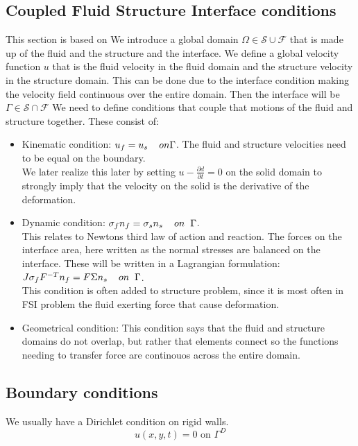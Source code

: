 \subsection*{Coupled Fluid Structure Interface conditions}
This section is based on 
We introduce a global domain $\Omega \in \mathcal{S} \cup \mathcal{F} $ that is made up of the fluid and the structure and the interface. We define a global velocity function $u$ that is the fluid velocity in the fluid domain and the structure velocity in the structure domain. This can be done due to the interface condition making the velocity field continuous over the entire domain. Then the interface will be $ \Gamma \in \mathcal{S} \cap \mathcal{F}  $  
We need to define conditions that couple that motions of the fluid and structure together. These consist of:
\begin{itemize}
\item Kinematic condition: $u_f = u_s  \hspace{4mm} on \Gamma$. The fluid and structure velocities need to be equal on the boundary. \\
We later realize this later by setting  $u- \frac{\partial d}{\partial t}  = 0  $ on the solid domain to strongly imply that the velocity on the solid is the derivative of the deformation.  
\item Dynamic condition: $  \sigma_f n_f = \sigma_s n_s \hspace{4mm} on  \hspace{2mm}\Gamma   $. \\
	This relates to Newtons third law of action and reaction. The forces on the interface area, here written as the normal stresses are balanced on the interface. These will be written in a Lagrangian formulation: \\
	$J\sigma_f F^{-T} n_f = F\Sigma n_s \hspace{4mm} on  \hspace{2mm}\Gamma $. \\
	This condition is often added to structure problem, since it is most often in FSI problem the fluid exerting force that cause deformation.
\item Geometrical condition: This condition says that the fluid and structure domains do not overlap, but rather that elements connect so the functions needing to transfer force are continouos across the entire domain.
\end{itemize}



\subsection*{Boundary conditions}
We usually have a Dirichlet condition on rigid walls.
$$  u(x,y,t) = 0   \text{  on  } \Gamma^D $$







